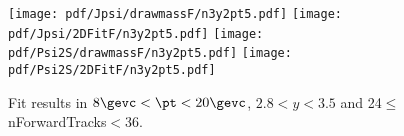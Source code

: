 \begin{figure}[H]
\begin{center}
\texttt{[image: pdf/Jpsi/drawmassF/n3y2pt5.pdf]}
\texttt{[image: pdf/Jpsi/2DFitF/n3y2pt5.pdf]}
\vspace*{-0.5cm}
\texttt{[image: pdf/Psi2S/drawmassF/n3y2pt5.pdf]}
\texttt{[image: pdf/Psi2S/2DFitF/n3y2pt5.pdf]}
\vspace*{-0.5cm}
\end{center}
\caption{Fit results in $8\gevc<\pt<20\gevc$, $2.8<y<3.5$ and 24$\leq$nForwardTracks$<$36.}
\label{Fitn3y2pt5}
\end{figure}
